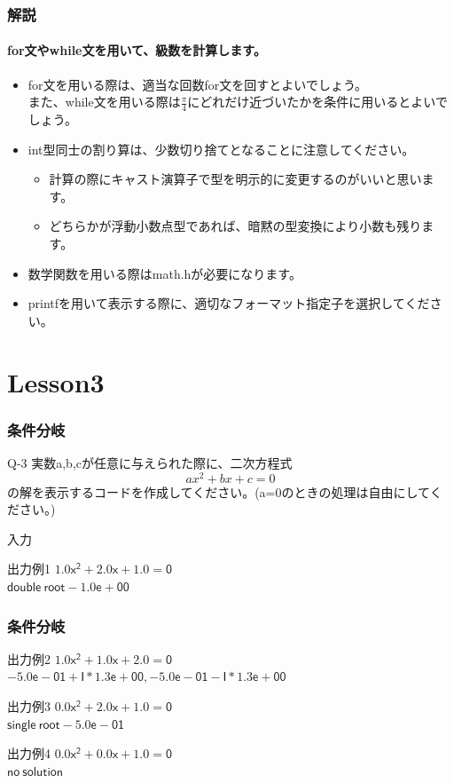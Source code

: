 \documentclass[dvipdfmx]{beamer}
\begin{document}
\begin{frame}
	\frametitle{解説}
	\framesubtitle{for文やwhile文を用いて、級数を計算します。}
	\begin{itemize}
	\item for文を用いる際は、適当な回数for文を回すとよいでしょう。\\
	また、while文を用いる際は$\frac{\pi}{4}$にどれだけ近づいたかを条件に用いるとよいでしょう。
	\item int型同士の割り算は、少数切り捨てとなることに注意してください。\\
		\begin{itemize}
			\item 計算の際にキャスト演算子で型を明示的に変更するのがいいと思います。
			\item どちらかが浮動小数点型であれば、暗黙の型変換により小数も残ります。
		\end{itemize}
	\item 数学関数を用いる際はmath.hが必要になります。
	\item printfを用いて表示する際に、適切なフォーマット指定子を選択してください。
	\end{itemize}
\end{frame}

\section{Lesson3}
\begin{frame}
	\frametitle{条件分岐}
	\begin{itembox}[l]{Q-3}
		実数a,b,cが任意に与えられた際に、二次方程式
		$$ax^2+bx+c=0$$
		の解を表示するコードを作成してください。(a=0のときの処理は自由にしてください。)
	\end{itembox}
	\begin{block}{入力}
	\end{block}
	\begin{block}{出力例1}
		$\mathsf{1.0x^2 + 2.0x + 1.0 = 0}$\\
		$\mathsf{double \ root -1.0e+00}$
	\end{block}
\end{frame}

\begin{frame}
	\frametitle{条件分岐}
	\begin{block}{出力例2}
		$\mathsf{1.0x^2 + 1.0x + 2.0 = 0}$\\
		$\mathsf{-5.0e-01 + I * 1.3e+00, -5.0e-01 - I * 1.3e+00}$
	\end{block}
	\begin{block}{出力例3}
	$\mathsf{0.0x^2 + 2.0x + 1.0 = 0}$\\
	$\mathsf{single \ root -5.0e-01}$
	\end{block}
	\begin{block}{出力例4}
		$\mathsf{0.0x^2 + 0.0x + 1.0 = 0}$\\
		$\mathsf{no\ solution}$
	\end{block}
\end{frame}
\end{document}

